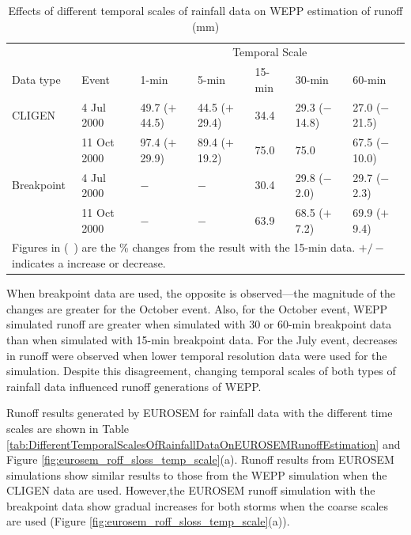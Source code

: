 \begin{table}[htbp]
  \centering
  \footnotesize
  \caption[Effects of different temporal scales of rainfall data on WEPP
estimation of runoff]{Effects of different temporal scales of rainfall data on
WEPP estimation of runoff (mm)}
  \label{tab:DifferentTemporalScalesOfRainfallDataOnWEPPRunoffEstimation}
    \begin{tabular}{lllllll}
      \toprule
      & & \multicolumn{5}{c}{Temporal Scale}\\
      \cmidrule{3-7}
      Data type & Event & 1-min & 5-min & 15-min & 30-min & 60-min \\
      \midrule
      CLIGEN & 4 Jul 2000 & 49.7 ($+$44.5) & 44.5 ($+$29.4) & 34.4 & 29.3
($-$14.8) & 27.0 ($-$21.5) \\
       & 11 Oct 2000 & 97.4 ($+$29.9) & 89.4 ($+$19.2) & 75.0 & 75.0 & 67.5
($-$10.0) \\
       \midrule
      Breakpoint & 4 Jul 2000 & $-$ & $-$ & 30.4 & 29.8 ($-$2.0) & 29.7
($-$2.3)\\
       & 11 Oct 2000 & $-$ & $-$ & 63.9 & 68.5 ($+$7.2) & 69.9 ($+$9.4)\\
      \bottomrule
      \multicolumn{7}{p{12cm}}{\footnotesize Figures in (\ ) are the \% changes
from the result with the 15-min data. $+/-$ indicates a increase or decrease.}\\
    \end{tabular}
\end{table}

When breakpoint data are used, the opposite is observed---the magnitude of the
changes are greater for the October event. Also, for the October event, WEPP
simulated runoff are greater when simulated with 30 or 60-min breakpoint data
than when simulated with 15-min breakpoint data. For the July event, decreases
in runoff were observed when lower temporal resolution data were used for
the simulation. Despite this disagreement, changing temporal scales of both
types of rainfall data influenced runoff generations of WEPP.

Runoff results generated by EUROSEM for rainfall data with the different time
scales are shown in Table
\ref{tab:DifferentTemporalScalesOfRainfallDataOnEUROSEMRunoffEstimation} and
Figure \ref{fig:eurosem_roff_sloss_temp_scale}(a). Runoff results from EUROSEM
simulations show similar results to those from the WEPP simulation when the
CLIGEN data are used. However,the EUROSEM runoff simulation with the breakpoint
data show gradual increases for both storms when the coarse scales are used
(Figure \ref{fig:eurosem_roff_sloss_temp_scale}(a)).

